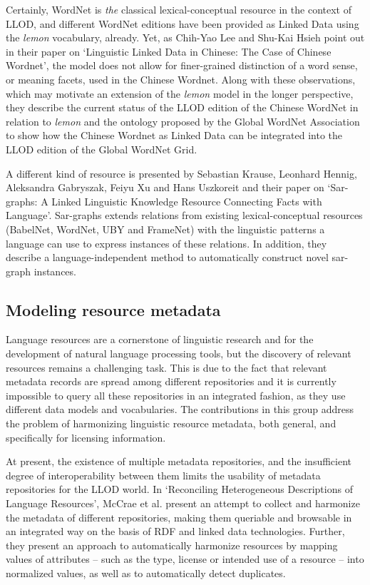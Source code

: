 Certainly, WordNet is \emph{the} classical lexical-conceptual resource in the context of LLOD, and different WordNet editions have been provided as Linked Data using the \emph{lemon} vocabulary, already.
Yet, as Chih-Yao Lee and Shu-Kai Hsieh point out in their paper on `Linguistic Linked Data in Chinese: The Case of Chinese Wordnet', the model does not allow for finer-grained distinction of a word sense, or meaning facets, used in the Chinese Wordnet. Along with these observations, which may motivate an extension of the \emph{lemon} model in the longer perspective, they describe the current status of the LLOD edition of the Chinese WordNet in relation to \emph{lemon} and the ontology proposed by the Global WordNet Association to show how the Chinese Wordnet as Linked Data can be integrated into the LLOD edition of the Global WordNet Grid.

A different kind of resource is presented by Sebastian Krause, Leonhard Hennig, Aleksandra Gabryszak, Feiyu Xu and Hans Uszkoreit and  their paper on `Sar-graphs: A Linked Linguistic Knowledge Resource Connecting Facts with Language'. Sar-graphs extends relations from existing lexical-conceptual resources (BabelNet, WordNet, UBY and FrameNet) with the linguistic patterns a language can use to express instances of these relations. In addition, they describe a language-independent method to automatically construct novel sar-graph instances. 

\subsection{Modeling resource metadata}

Language resources are a cornerstone of linguistic research and for the development of natural language processing tools, but the discovery of relevant resources remains a challenging task. 
This is due to the fact that relevant metadata records are spread among different repositories and it is currently impossible to query all these repositories in an integrated fashion, as they use different data models and vocabularies. The contributions in this group address the problem of harmonizing linguistic resource metadata, both general, and specifically for licensing information.

At present, the existence of multiple metadata repositories, and the insufficient degree of interoperability between them limits the usability of metadata repositories for the LLOD world. 
In `Reconciling Heterogeneous Descriptions of Language Resources', McCrae et al. present an attempt to collect and harmonize the metadata of different repositories, making them queriable and browsable in an integrated way on the basis of RDF and linked data technologies. Further, they present an approach to automatically harmonize resources by mapping values of attributes -- such as the type, license or intended use of a resource -- into normalized values, as well as to automatically detect duplicates.

